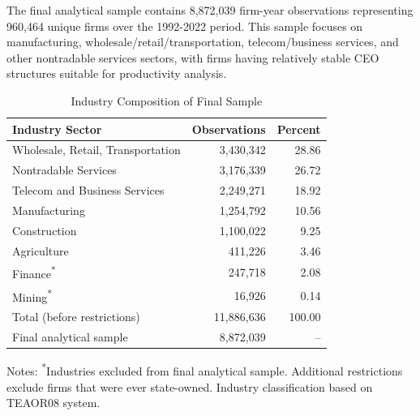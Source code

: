 \documentclass[11pt,a4paper]{article}
\begin{document}
The final analytical sample contains 8,872,039 firm-year observations representing 960,464 unique firms over the 1992-2022 period. This sample focuses on manufacturing, wholesale/retail/transportation, telecom/business services, and other nontradable services sectors, with firms having relatively stable CEO structures suitable for productivity analysis.

\begin{table}[htbp]
\centering
\caption{Industry Composition of Final Sample}
\label{tab:industry}
\begin{tabular}{lrr}
\toprule
Industry Sector & Observations & Percent \\
\midrule
Wholesale, Retail, Transportation & 3,430,342 & 28.86 \\
Nontradable Services & 3,176,339 & 26.72 \\
Telecom and Business Services & 2,249,271 & 18.92 \\
Manufacturing & 1,254,792 & 10.56 \\
Construction & 1,100,022 & 9.25 \\
Agriculture & 411,226 & 3.46 \\
Finance\textsuperscript{*} & 247,718 & 2.08 \\
Mining\textsuperscript{*} & 16,926 & 0.14 \\
\midrule
Total (before restrictions) & 11,886,636 & 100.00 \\
Final analytical sample & 8,872,039 & -- \\
\bottomrule
\end{tabular}
\footnotesize
Notes: \textsuperscript{*}Industries excluded from final analytical sample. Additional restrictions exclude firms that were ever state-owned. Industry classification based on TEAOR08 system.
\end{table}
\end{document}
